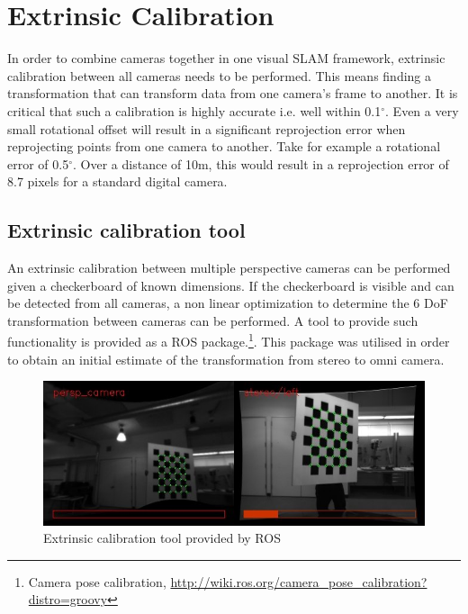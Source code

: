 \chapter{Extrinsic Calibration}
\label{chapter:extrinsic_calibration}

In order to combine cameras together in one visual SLAM framework, extrinsic calibration between all cameras needs to be performed.  This means finding a transformation that can transform data from one camera's frame to another.  It is critical that such a calibration is highly accurate i.e. well within 0.1$^{\circ}$.  Even a very small rotational offset will result in a significant reprojection error when reprojecting points from one camera to another.  Take for example a rotational error of 0.5$^{\circ}$.  Over a distance of 10m, this would result in a reprojection error of 8.7 pixels for a standard digital camera.

\section{Extrinsic calibration tool}
\label{sec:ros_tool}

An extrinsic calibration between multiple perspective cameras can be performed given a checkerboard of known dimensions.  If the checkerboard is visible and can be detected from all cameras, a non linear optimization to determine the 6 DoF transformation between cameras can be performed.  A tool to provide such functionality is provided as a ROS package.\footnote{Camera pose calibration, \url{http://wiki.ros.org/camera_pose_calibration?distro=groovy}}.  This package was utilised in order to obtain an initial estimate of the transformation from stereo to omni camera.

\begin{figure}[h!]
  \centering
    \includegraphics[width=1.0\textwidth]{chapters/images/extrinsic_cal_1}
  \caption{Extrinsic calibration tool provided by ROS}
  \label{fig:extrinsic_cal_1}
\end{figure}

